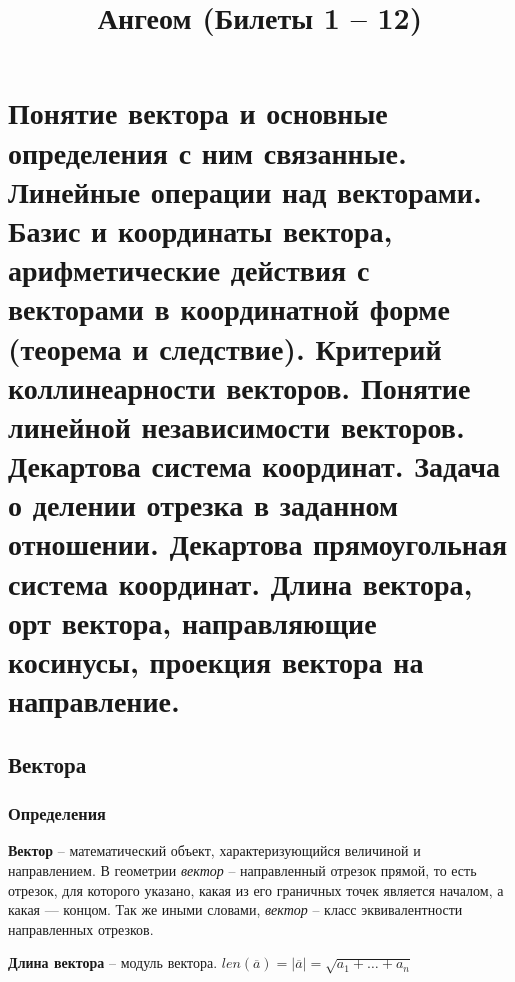\documentclass{article}
\title{Ангеом (Билеты 1 -- 12)}
\begin{document}
\maketitle
\tableofcontents

\newpage
\section{Понятие вектора и основные определения с ним связанные. Линейные операции над векторами. Базис и координаты вектора, арифметические действия с векторами в координатной форме (теорема и следствие). Критерий коллинеарности векторов. Понятие линейной независимости векторов. Декартова система координат. Задача о делении отрезка в заданном отношении. Декартова прямоугольная система координат. Длина вектора, орт вектора, направляющие косинусы, проекция вектора на направление.}
\subsection{Вектора}
\subsubsection{Определения}
\textbf{Вектор} -- математический объект, характеризующийся величиной и направлением. В геометрии \textit{вектор} -- направленный отрезок прямой, то есть отрезок, для которого указано, какая из его граничных точек является началом, а какая — концом. Так же иными словами, \textit{вектор} -- класс эквивалентности направленных отрезков.

\textbf{Длина вектора} -- модуль вектора. $len(\overline{a})=|\overline{a}|=\sqrt{a_1+\ldots+a_n}$
\end{document}
